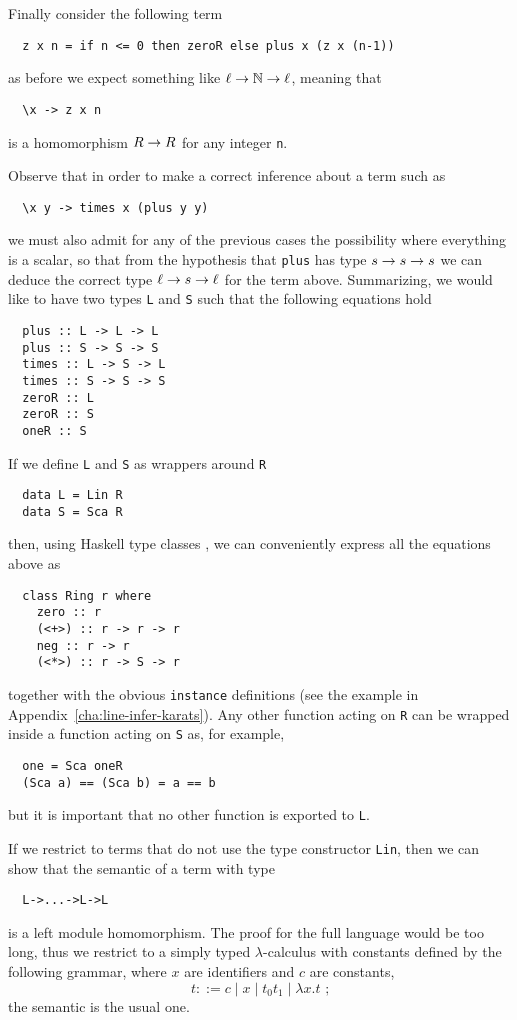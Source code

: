 Finally consider the following term
\begin{lstlisting}
  z x n = if n <= 0 then zeroR else plus x (z x (n-1))
\end{lstlisting}
as before we expect something like $\ell\rightarrow\mathbb{N}\rightarrow\ell$, meaning that
\begin{lstlisting}
  \x -> z x n
\end{lstlisting}
is a homomorphism $R\rightarrow R$ for any integer \lstinline{n}.

Observe that in order to make a correct inference about a term such as
\begin{lstlisting}
  \x y -> times x (plus y y)
\end{lstlisting}
we must also admit for any of the previous cases the possibility where
everything is a scalar, so that from the hypothesis that
\lstinline{plus} has type $s\rightarrow s\rightarrow s$ we can deduce the correct type
$\ell\rightarrow s\rightarrow\ell$ for the term above. Summarizing, we would like to
have two types \lstinline{L} and \lstinline{S} such that the following
equations hold
\begin{lstlisting}
  plus :: L -> L -> L
  plus :: S -> S -> S
  times :: L -> S -> L
  times :: S -> S -> S
  zeroR :: L
  zeroR :: S
  oneR :: S
\end{lstlisting}

If we define \lstinline{L} and \lstinline{S} as wrappers around
\lstinline{R}
\begin{lstlisting}
  data L = Lin R
  data S = Sca R
\end{lstlisting}
then, using Haskell type classes
\cite{Walder+Blott-ad-hoc-polymorphism}, we can conveniently express
all the equations above as
\begin{lstlisting}
  class Ring r where
    zero :: r
    (<+>) :: r -> r -> r
    neg :: r -> r
    (<*>) :: r -> S -> r
\end{lstlisting}
together with the obvious \lstinline{instance} definitions (see the
example in Appendix~\ref{cha:line-infer-karats}). Any other function
acting on \lstinline{R} can be wrapped inside a function acting on
\lstinline{S} as, for example,
\begin{lstlisting}
  one = Sca oneR
  (Sca a) == (Sca b) = a == b
\end{lstlisting}
but it is important that no other function is exported to
\lstinline{L}.

If we restrict to terms that do not use the type constructor
\lstinline{Lin}, then we can show that the semantic of a term with
type
\begin{lstlisting}
  L->...->L->L
\end{lstlisting}
is a left module homomorphism.  The proof for the full language would
be too long, thus we restrict to a simply typed $\lambda$-calculus
with constants defined by the following grammar, where $x$ are
identifiers and $c$ are constants,
\begin{equation}
  \label{eq:lambda}
  t ::= c \;|\; x \;|\; t_0 t_1 \;|\; \lambda x . t  \text{ ;}
\end{equation}
the semantic is the usual one.

